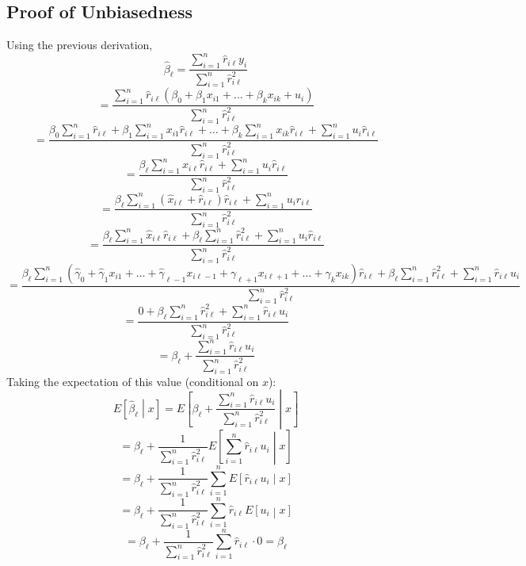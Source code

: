 \documentclass[11pt]{article}
\begin{document}
\newpage

\subsection*{Proof of Unbiasedness}

Using the previous derivation,$$\hat{\beta}_{\ell}=\frac{\sum_{i=1}^{n}\hat{r}_{i\ell}y_i}{\sum_{i=1}^{n}\hat{r}_{i\ell}^2}$$
$$=\frac{\sum_{i=1}^{n}\hat{r}_{i\ell}\left(\beta_0+\beta_1x_{i1}+\dots+\beta_kx_{ik}+u_i\right)}{\sum_{i=1}^{n}\hat{r}_{i\ell}^2}$$
$$=\frac{\beta_0\sum_{i=1}^{n}\hat{r}_{i\ell}+\beta_1\sum_{i=1}^{n}x_{i1}\hat{r}_{i\ell}+\dots+\beta_k\sum_{i=1}^{n}x_{ik}\hat{r}_{i\ell}+\sum_{i=1}^{n}u_i\hat{r}_{i\ell}}{\sum_{i=1}^{n}\hat{r}_{i\ell}^2}$$
$$=\frac{\beta_\ell\sum_{i=1}^{n}x_{i\ell}\hat{r}_{i\ell}+\sum_{i=1}^{n}u_i\hat{r}_{i\ell}}{\sum_{i=1}^{n}\hat{r}_{i\ell}^2}$$
$$=\frac{\beta_\ell\sum_{i=1}^{n}\left(\hat{x}_{i\ell}+\hat{r}_{i\ell}\right)\hat{r}_{i\ell}+\sum_{i=1}^{n}u_i\hat{r}_{i\ell}}{\sum_{i=1}^{n}\hat{r}_{i\ell}^2}$$
$$=\frac{\beta_\ell\sum_{i=1}^{n}\hat{x}_{i\ell}\hat{r}_{i\ell}+\beta_\ell\sum_{i=1}^{n}\hat{r}_{i\ell}^2+\sum_{i=1}^{n}u_i\hat{r}_{i\ell}}{\sum_{i=1}^{n}\hat{r}_{i\ell}^2}$$
$$=\frac{\beta_\ell\sum_{i=1}^{n}\left(\hat{\gamma}_0+\hat{\gamma}_1x_{i1}+\dots+\hat{\gamma}_{\ell-1}x_{i\ell-1}+\gamma_{\ell+1}x_{i\ell+1}+\dots+\gamma_{k}x_{ik}\right)\hat{r}_{i\ell}+\beta_\ell\sum_{i=1}^{n}\hat{r}_{i\ell}^2+\sum_{i=1}^{n}\hat{r}_{i\ell}u_i}{\sum_{i=1}^{n}\hat{r}_{i\ell}^2}$$
$$=\frac{0+\beta_\ell\sum_{i=1}^{n}\hat{r}_{i\ell}^2+\sum_{i=1}^{n}\hat{r}_{i\ell}u_i}{\sum_{i=1}^{n}\hat{r}_{i\ell}^2}$$
$$=\beta_\ell+\frac{\sum_{i=1}^{n}\hat{r}_{i\ell}u_i}{\sum_{i=1}^{n}\hat{r}_{i\ell}^2}$$
Taking the expectation of this value (conditional on $x$):$$E\left[\hat{\beta}_\ell\middle|x\right]=E\left[\beta_\ell+\frac{\sum_{i=1}^{n}\hat{r}_{i\ell}u_i}{\sum_{i=1}^{n}\hat{r}_{i\ell}^2}\middle|x\right]$$
$$=\beta_\ell+\frac{1}{\sum_{i=1}^{n}\hat{r}_{i\ell}^2}E\left[\sum_{i=1}^{n}\hat{r}_{i\ell}u_i\middle|x\right]$$
$$=\beta_\ell+\frac{1}{\sum_{i=1}^{n}\hat{r}_{i\ell}^2}\sum_{i=1}^{n}E\left[\hat{r}_{i\ell}u_i\middle|x\right]$$
$$=\beta_\ell+\frac{1}{\sum_{i=1}^{n}\hat{r}_{i\ell}^2}\sum_{i=1}^{n}\hat{r}_{i\ell}E\left[u_i\middle|x\right]$$
$$=\beta_\ell+\frac{1}{\sum_{i=1}^{n}\hat{r}_{i\ell}^2}\sum_{i=1}^{n}\hat{r}_{i\ell}\cdot 0=\beta_\ell$$

\newpage
\end{document}
